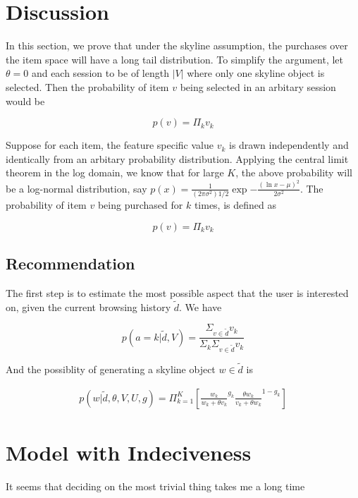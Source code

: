 \documentclass[sigconf]{acmart}
\begin{document}
\section{Discussion}

In this section, we prove that under the skyline assumption, the purchases over the item space will have a long tail distribution. To simplify the argument, let $\theta=0$ and each session to be of length $|V|$ where only one skyline object is selected. Then the probability of item $v$ being selected in an arbitary session would be 

\begin{equation*}
p(v)=\Pi_k v_k
\end{equation*}

Suppose for each item, the feature specific value $v_k$ is drawn independently and identically from an arbitary probability distribution. Applying the central limit theorem in the log domain, we know that for large $K$, the above probability will be a log-normal distribution, say $p(x)=\frac{1}{{(2\pi\sigma^2)}{1/2}}\exp{-\frac{{(\ln x - \mu)}^2}{2\sigma^2}}$. The probability of item $v$ being purchased for $k$ times, is defined as 

\begin{equation*}
p(v)=\Pi_k v_k
\end{equation*}

\subsection{Recommendation}
The first step is to estimate the most possible aspect that the user is interested on, given the current browsing history $\tilde{d}$. We have

\begin{equation}\label{aprobability}
p(a=k|\tilde{d},V)=\frac{\Sigma_{v\in \tilde{d}} v_k}{\Sigma_k \Sigma_{v\in \tilde{d}} v_k}
\end{equation}

And the possiblity of generating a skyline object $w\in \tilde{d}$ is 

\begin{align}\label{equ:skylineprobability}
		p(w|\tilde{d},\theta,V,U,g) %
		= \Pi_{k=1}^{K}[ {\frac{w_k}{w_k+\theta v_k}}^{g_k} { \frac{\theta w_{k}}{v_{k}+\theta w_{k}}}^{1-g_k}]
\end{align}

\section{Model with Indeciveness}
It seems that deciding on the most trivial thing takes me a long time


\end{document}
